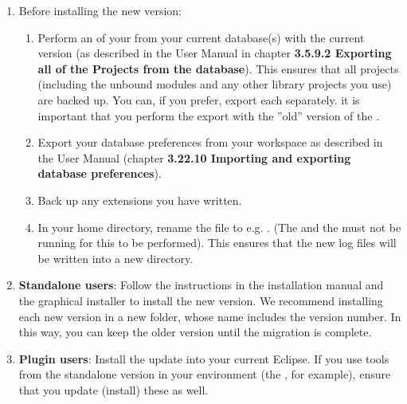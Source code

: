\begin{enumerate}
\item Before installing the new version:
\begin{enumerate}
\item Perform an  of your \gdprojects{} from your current database(s) with the current version  (as described in the User Manual in chapter \textbf{3.5.9.2 Exporting all of the Projects from the database}). This ensures that all projects (including the unbound modules and any other library projects you use) are backed up. You can, if you prefer, export each \gdproject{} separately. it is important that you perform the export with the ''old'' version of the \ite{}. 
\item Export your database preferences from your workspace as described in the User Manual (chapter \textbf{3.22.10 Importing and exporting database preferences}).
\item Back up any extensions you have written.
\item In your home directory, rename the  file to e.g. . (The \ite{} and the \gdagent{} must not be running for this to be performed). This ensures that the new log files will be written into a new  directory. 
\end{enumerate}
\item \textbf{Standalone users}: Follow the instructions in the installation manual and the graphical installer to install the new version. We recommend installing each new version in a new folder, whose name includes the version number. In this way, you can keep the older version until the migration is complete. 
\item \textbf{Plugin users}: Install the update into your current Eclipse. If you use tools from the standalone version in your environment (the \gdagent{}, for example), ensure that you update (install) these as well. 
\end{enumerate}
